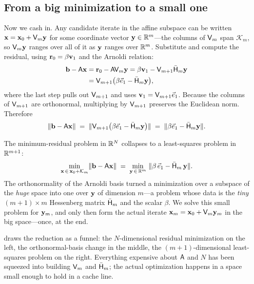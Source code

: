 \subsection{From a big minimization to a small one}

Now we cash in. Any candidate iterate in the affine subspace can be written
$\mathbf{x}=\mathbf{x}_0+\mathsf{V}_m\mathbf{y}$ for some coordinate vector $\mathbf{y}\in\mathbb{R}^m$---the columns of
$\mathsf{V}_m$ span $\mathcal{K}_m$, so $\mathsf{V}_m\mathbf{y}$ ranges over all of it as $\mathbf{y}$
ranges over $\mathbb{R}^m$. Substitute and compute the residual, using $\mathbf{r}_0=\beta\mathbf{v}_1$
and the Arnoldi relation:
\begin{align*}
  \mathbf{b}-\mathsf{A}\mathbf{x}
    &= \mathbf{r}_0 - \mathsf{A}\mathsf{V}_m\mathbf{y}
     = \beta\mathbf{v}_1 - \mathsf{V}_{m+1}\bar{\mathsf{H}}_m\mathbf{y} \\
    &= \mathsf{V}_{m+1}\bigl(\beta\vec e_1 - \bar{\mathsf{H}}_m\mathbf{y}\bigr),
\end{align*}
where the last step pulls out $\mathsf{V}_{m+1}$ and uses $\mathbf{v}_1=\mathsf{V}_{m+1}\vec e_1$.
Because the columns of $\mathsf{V}_{m+1}$ are orthonormal, multiplying by
$\mathsf{V}_{m+1}$ preserves the Euclidean norm. Therefore
\[
  \lVert\mathbf{b}-\mathsf{A}\mathbf{x}\rVert
    \;=\; \lVert\mathsf{V}_{m+1}\bigl(\beta\vec e_1-\bar{\mathsf{H}}_m\mathbf{y}\bigr)\rVert
    \;=\; \lVert\beta\vec e_1-\bar{\mathsf{H}}_m\mathbf{y}\rVert.
\]

\begin{keyidea}
The minimum-residual problem in $\mathbb{R}^N$ collapses to a least-squares problem in
$\mathbb{R}^{m+1}$:
\[
  \min_{\mathbf{x}\,\in\,\mathbf{x}_0+\mathcal{K}_m}\lVert\mathbf{b}-\mathsf{A}\mathbf{x}\rVert
  \;=\;
  \min_{\mathbf{y}\,\in\,\mathbb{R}^m}\ \lVert\beta\,\vec e_1-\bar{\mathsf{H}}_m\,\mathbf{y}\rVert.
\]
The orthonormality of the Arnoldi basis turned a minimization over a subspace of
the \emph{huge} space into one over $\mathbf{y}$ of dimension $m$---a problem whose data is
the \emph{tiny} $(m{+}1)\times m$ Hessenberg matrix $\bar{\mathsf{H}}_m$ and the scalar
$\beta$. We solve this small problem for $\mathbf{y}_m$, and only then form the actual
iterate $\mathbf{x}_m=\mathbf{x}_0+\mathsf{V}_m\mathbf{y}_m$ in the big space---once, at the end.
\end{keyidea}

 draws the reduction as a funnel: the $N$-dimensional residual
minimization on the left, the orthonormal-basis change in the middle, the
$(m{+}1)$-dimensional least-squares problem on the right. Everything expensive about
$\mathsf{A}$ and $N$ has been squeezed into building $\mathsf{V}_m$ and $\bar{\mathsf{H}}_m$;
the actual optimization happens in a space small enough to hold in a cache line.

